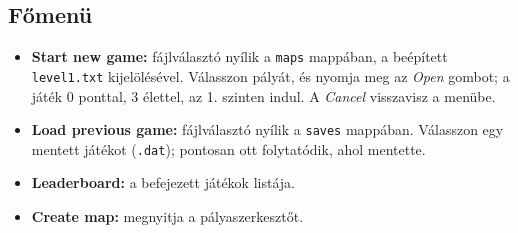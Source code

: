\documentclass[11pt, a4paper]{article}
\begin{document}
\subsection*{Főmenü}
\begin{itemize}
    \item \textbf{Start new game:} fájlválasztó nyílik a \texttt{maps} mappában, a beépített \texttt{level1.txt} kijelölésével. Válasszon pályát, és nyomja meg az \textit{Open} gombot; a játék 0 ponttal, 3 élettel, az 1. szinten indul. A \textit{Cancel} visszavisz a menübe.
    \item \textbf{Load previous game:} fájlválasztó nyílik a \texttt{saves} mappában. Válasszon egy mentett játékot (\texttt{.dat}); pontosan ott folytatódik, ahol mentette.
    \item \textbf{Leaderboard:} a befejezett játékok listája.
    \item \textbf{Create map:} megnyitja a pályaszerkesztőt.
\end{itemize}
\end{document}
